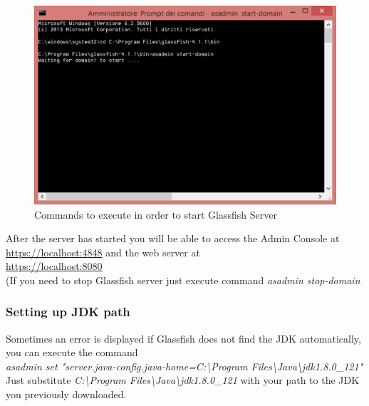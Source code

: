 \begin{figure}[H]
\begin{center}
		\includegraphics[width=1.1\textwidth]{images/asadminstart}
		\caption{Commands to execute in order to start Glassfish Server}
		\label{asadminstart}
\end{center}
\end{figure}

After the server has started you will be able to access the Admin Console at  \\
\href{url}{https://localhost:4848} and the web server at \\
\href{url}{https://localhost:8080} 
\\(If you need to stop Glassfish server just execute command \textit{asadmin stop-domain}

\subsubsection{Setting up JDK path}
Sometimes an error is displayed if Glassfish does not find the JDK automatically, you can execute the command \\ \textit{asadmin set "server.java-config.java-home=C:\textbackslash Program Files\textbackslash Java\textbackslash jdk1.8.0_121"} \\
Just substitute \textit{C:\textbackslash Program Files\textbackslash Java\textbackslash jdk1.8.0_121} with your path to the JDK you previously downloaded.

